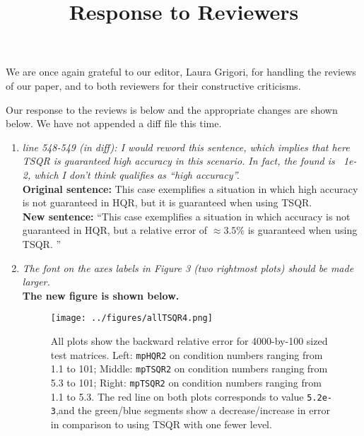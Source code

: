 \documentclass[final,onefignum,onetabnum]{siamart190516}
\begin{document}
\title{Response to Reviewers}
\date{}
\maketitle
We are once again grateful to our editor, Laura Grigori, for handling the reviews of our paper, and to both reviewers for their constructive criticisms.

Our response to the reviews is below and the appropriate changes are shown below. We have not appended a diff file this time.\\

\begin{enumerate}
	\item \textit{line 548-549 (in diff): I would reword this sentence, which implies that here TSQR is guaranteed high accuracy in this scenario. In fact, the found is ~1e-2, which I don't think qualifies as ``high accuracy''.}\\
	\textbf{Original sentence:} This case exemplifies a situation in which high accuracy is not guaranteed in HQR, but it is guaranteed when using TSQR.\\
	\textbf{New sentence:} ``This case exemplifies a situation in which accuracy is not guaranteed in HQR, but a relative error of $\approx 3.5\%$ is guaranteed when using TSQR. ''
	\item \textit{The font on the axes labels in Figure 3 (two rightmost plots) should be made larger.}\\
	\textbf{The new figure is shown below.}
	\begin{figure}[h!]%
		\centering
		\texttt{[image: ../figures/allTSQR4.png]}
		\vspace{-15pt}
		\caption{\label{fig:allTSQR} All plots show the backward relative error for 4000-by-100 sized test matrices. Left: {\tt mpHQR2} on condition numbers ranging from 1.1 to 101;  Middle: {\tt mpTSQR2} on condition numbers ranging from 5.3 to 101; Right:  {\tt mpTSQR2} on condition numbers ranging from 1.1 to 5.3.  The red line on both plots corresponds to value {\tt 5.2e-3},and the green/blue segments show a decrease/increase in error in comparison to using TSQR with one fewer level. }
		\vspace{-5pt}
	\end{figure}
	
\end{enumerate}

%

%
\end{document}
